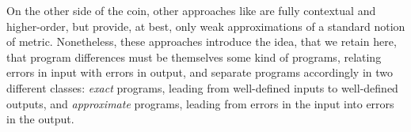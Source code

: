  
On the other side of the coin, other approaches like \cite{chaudhuri, dallago:differential-stlc} are fully contextual and higher-order, but provide, at best, only weak approximations of a standard notion of metric.  
 Nonetheless, these approaches introduce the idea, that we retain here, that program differences must be  themselves some kind of programs, relating errors in input with errors in  output,  and separate programs accordingly in two different classes: \emph{exact} programs, leading from well-defined inputs to well-defined outputs, and \emph{approximate} programs, leading from errors in the input into errors in the output.
%

%
%
%
%
%
%
%



